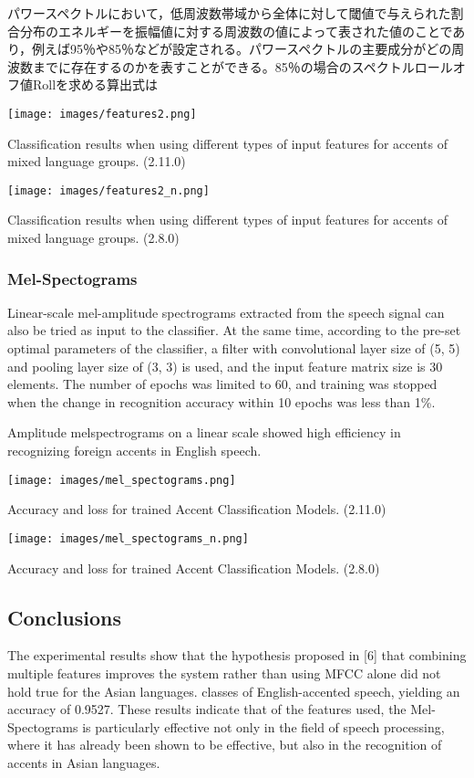 パワースペクトルにおいて，低周波数帯域から全体に対して閾値で与えられた割合分布のエネルギーを振幅値に対する周波数の値によって表された値のことであり，例えば95％や85％などが設定される。パワースペクトルの主要成分がどの周波数までに存在するのかを表すことができる。85％の場合のスペクトルロールオフ値Rollを求める算出式は\documentclass[ams]{U-AizuGT}
\begin{document}
\begin{table}[h]
    \centering
    \texttt{[image: images/features2.png]}
    \caption{ Classification results when using different types of input features for accents of mixed language groups. (2.11.0)}
\end{table}
\begin{table}[h]
    \centering
    \texttt{[image: images/features2\_n.png]}
    \caption{ Classification results when using different types of input features for accents of mixed language groups. (2.8.0)}
\end{table}

\subsubsection{Mel-Spectograms}
Linear-scale mel-amplitude spectrograms extracted from the speech signal can also be tried as input to the classifier. At the same time, according to the pre-set optimal parameters of the classifier, a filter with convolutional layer size of (5, 5) and pooling layer size of (3, 3) is used, and the input feature matrix size is 30 elements. The number of epochs was limited to 60, and training was stopped when the change in recognition accuracy within 10 epochs was less than 1\%.\par
Amplitude melspectrograms on a linear scale showed high efficiency in recognizing foreign accents in English speech.
\begin{table}[h]
    \centering
    \texttt{[image: images/mel\_spectograms.png]}
    \caption{Accuracy and loss for trained Accent Classification Models. (2.11.0)}
\end{table}
\begin{table}[h]
    \centering
    \texttt{[image: images/mel\_spectograms\_n.png]}
    \caption{Accuracy and loss for trained Accent Classification Models. (2.8.0)}
\end{table}

\subsection{Conclusions}
The experimental results show that the hypothesis proposed in [6] that combining multiple features improves the system rather than using MFCC alone did not hold true for the Asian languages. classes of English-accented speech, yielding an accuracy of 0.9527. These results indicate that of the features used, the Mel-Spectograms is particularly effective not only in the field of speech processing, where it has already been shown to be effective, but also in the recognition of accents in Asian languages.
\end{document}
